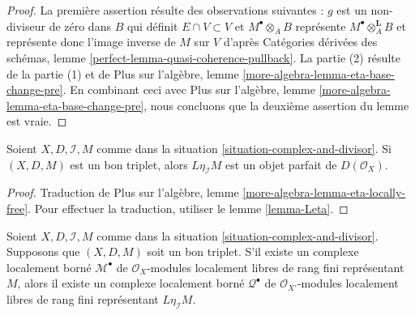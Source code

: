 \begin{proof}
La première assertion résulte des observations suivantes :
$g$ est un non-diviseur de zéro dans $B$ qui définit $E \cap V \subset V$
et $M^\bullet \otimes_A B$ représente $M^\bullet \otimes_A^\mathbf{L} B$
et représente donc l'image inverse de $M$ sur $V$ d'après
Catégories dérivées des schémas, lemme
\ref{perfect-lemma-quasi-coherence-pullback}.
La partie (2) résulte de la partie (1) et de
Plus sur l'algèbre, lemme \ref{more-algebra-lemma-eta-base-change-pre}.
En combinant ceci avec
Plus sur l'algèbre, lemme \ref{more-algebra-lemma-eta-base-change-pre},
nous concluons que la deuxième assertion du lemme est vraie.
\end{proof}

\begin{lemma}
\label{lemma-good-triple}
Soient $X, D, \mathcal{I}, M$ comme dans la
situation \ref{situation-complex-and-divisor}.
Si $(X, D, M)$ est un bon triplet, alors
$L\eta_\mathcal{I}M$ est un objet parfait
de $D(\mathcal{O}_X)$.
\end{lemma}

\begin{proof}
Traduction de
Plus sur l'algèbre, lemme \ref{more-algebra-lemma-eta-locally-free}.
Pour effectuer la traduction, utiliser le lemme \ref{lemma-Leta}.
\end{proof}

\begin{lemma}
\label{lemma-good-triple-bdd-loc-free}
Soient $X, D, \mathcal{I}, M$ comme dans la
situation \ref{situation-complex-and-divisor}.
Supposons que $(X, D, M)$ soit un bon triplet.
S'il existe un complexe localement borné $\mathcal{M}^\bullet$
de $\mathcal{O}_X$-modules localement libres de rang fini représentant $M$,
alors il existe un complexe localement borné $\mathcal{Q}^\bullet$
de $\mathcal{O}_{X'}$-modules localement libres de rang fini représentant
$L\eta_\mathcal{I}M$.
\end{lemma}

